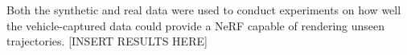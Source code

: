 Both the synthetic and real data were used to conduct experiments on how well the vehicle-captured data could provide a NeRF capable of rendering unseen trajectories. [INSERT RESULTS HERE]
\begin{comment}

Initially, this pipeline was applied to synthetic data gathered from a controlled virtual environment, CARLA, which facilitated the creation of a performance baseline. The establishment of this baseline underscored the significance of various parameters for the quality of the data capture and subsequent NeRF. The parameters included camera setup, segment length, dataset size, image resolution, and vehicle speed.

Subsequent experimentation built upon this baseline, revealing important findings. Optimized camera poses consistently produced superior renderings despite the presence of noise, with shorter segments proving particularly effective. In contrast, non-optimized poses only excelled with perfect camera poses. Furthermore, our experiments demonstrated that COLMAP pre-processing overwhelmingly outperformed joint camera pose optimization, even in high-noise situations, arguing for its consideration despite an upfront time investment.

Progressing into the exploration of large-scale NeRF approaches, we implemented a naive variant. The promising results of this implementation were evident across multiple scenes, with image synthesis displaying sharper details and a notable improvement in overall visual quality.

Applying the acquired knowledge from the previous experiments, a dataparser for the NAPLab vehicle was created, allowing the end-to-end pipeline to be used on real data. Despite lower-quality image synthesis due to the uncontrollable environment, many of the findings from the controllable, virtual environment held true. Although optimizing camera poses performed better than not optimizing them, COLMAP outperformed joint camera optimization overall. Additionally, the naive Block NeRF implementation performed better than a single NeRF.
\end{comment}

